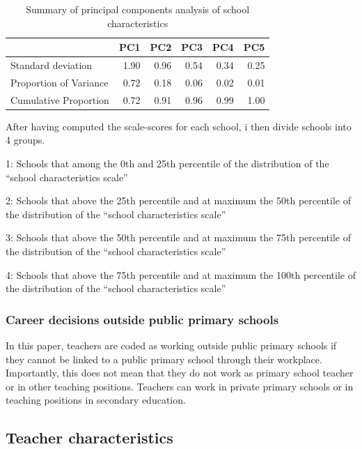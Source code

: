 \documentclass[
]{article}
\begin{document}
\begin{table}[!h]
\centering
\caption{\label{tab:scale-qual}Summary of principal components analysis of school characteristics}
\centering
\begin{tabular}[t]{l|r|r|r|r|r}
\hline
  & PC1 & PC2 & PC3 & PC4 & PC5\\
\hline
Standard deviation & 1.90 & 0.96 & 0.54 & 0.34 & 0.25\\
\hline
Proportion of Variance & 0.72 & 0.18 & 0.06 & 0.02 & 0.01\\
\hline
Cumulative Proportion & 0.72 & 0.91 & 0.96 & 0.99 & 1.00\\
\hline
\end{tabular}
\end{table}

After having computed the scale-scores for each school, i then divide schools into 4 groups.

1: Schools that among the 0th and 25th percentile of the distribution of the ``school characteristics scale''

2: Schools that above the 25th percentile and at maximum the 50th percentile of the distribution of the ``school characteristics scale''

3: Schools that above the 50th percentile and at maximum the 75th percentile of the distribution of the ``school characteristics scale''

4: Schools that above the 75th percentile and at maximum the 100th percentile of the distribution of the ``school characteristics scale''

\hypertarget{career-decisions-outside-public-primary-schools}{%
\subsubsection{Career decisions outside public primary schools}\label{career-decisions-outside-public-primary-schools}}

In this paper, teachers are coded as working outside public primary schools if they cannot be linked to a public primary school through their workplace. Importantly, this does not mean that they do not work as primary school teacher or in other teaching positions. Teachers can work in private primary schools or in teaching positions in secondary education.

\hypertarget{teacher-characteristics}{%
\subsection{Teacher characteristics}\label{teacher-characteristics}}
\end{document}
